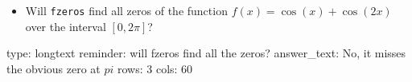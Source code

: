 \documentclass[12pt]{article}
\begin{document}
\begin{itemize}
\itemsep1pt\parskip0pt
\item
  Will \texttt{fzeros} find all zeros of the function
  $f(x) = \cos(x) + \cos(2x)$ over the interval $[0,2\pi]$?
\end{itemize}

\begin{answer}
type: longtext
reminder: will fzeros find all the zeros?
answer_text: No, it misses the obvious zero at \( pi \) 
rows: 3
cols: 60
\end{answer}
\end{document}
